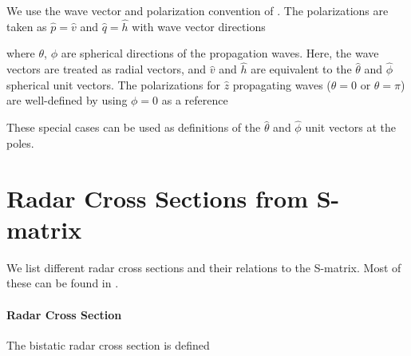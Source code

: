 We use the wave vector and polarization convention of \cite{tsang2000scattering}. The polarizations are taken as $\hat{p} = \hat{v}$ and $\hat{q} = \hat{h}$ with wave vector directions

\noindent where $\theta$, $\phi$ are spherical directions of the propagation waves. Here, the wave vectors are treated as radial vectors, and $\hat{v}$ and $\hat{h}$ are equivalent to the $\hat{\theta}$ and $\hat{\phi}$ spherical unit vectors. The polarizations for $\hat{z}$ propagating waves ($\theta = 0$ or $\theta = \pi$) are well-defined by using $\phi=0$ as a reference

These special cases can be used as definitions of the $\hat{\theta}$ and $\hat{\phi}$ unit vectors at the poles.

\section{Radar Cross Sections from S-matrix}

We list different radar cross sections and their relations to the S-matrix. Most of these can be found in \cite{tsang2000scattering}.

\paragraph{Radar Cross Section} The bistatic radar cross section is defined 

